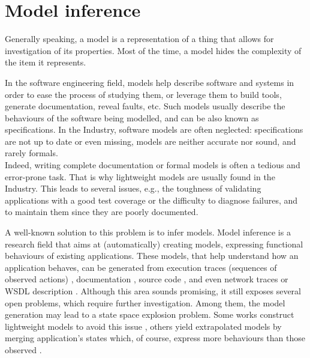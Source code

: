 \section{Model inference}
\label{sec:related:modelinf}

Generally speaking, a model is a representation of a thing that
allows for investigation of its properties. Most of the time, a
model hides the complexity of the item it represents.

In the software engineering field, models help describe software
and systems in order to ease the process of studying them, or
leverage them to build tools, generate documentation, reveal
faults, etc. Such models usually describe the behaviours of the
software being modelled, and can be also known as specifications.
In the Industry, software models are often neglected:
specifications are not up to date or even missing, models are
neither accurate nor sound, and rarely formals.\\
Indeed, writing complete documentation or formal models is often
a tedious and error-prone task. That is why lightweight models
are usually found in the Industry. This leads to several issues,
e.g., the toughness of validating applications with a good test
coverage or the difficulty to diagnose failures, and to maintain
them since they are poorly documented.

A well-known solution to this problem is to infer models. Model
inference is a research field that aims at (automatically)
creating models, expressing functional behaviours of existing
applications.  These models, that help understand how an
application behaves, can be generated from execution traces
(sequences of observed actions)
\cite{Krka:2010:UDE:1810295.1810324}, documentation
\cite{ZhongZXM11}, source code
\cite{Salah05scenariographer,Pradel:2009}, and even network
traces \cite{6079839} or WSDL description
\cite{Bertolino:2009:ASB:1595696.1595719}. Although this area
sounds promising, it still exposes several open problems, which
require further investigation. Among them, the model generation
may lead to a state space explosion problem. Some works construct
lightweight models to avoid this issue \cite{WPX13}, others yield
extrapolated models by merging application's states which, of
course, express more behaviours than those observed
\cite{4023976}.

